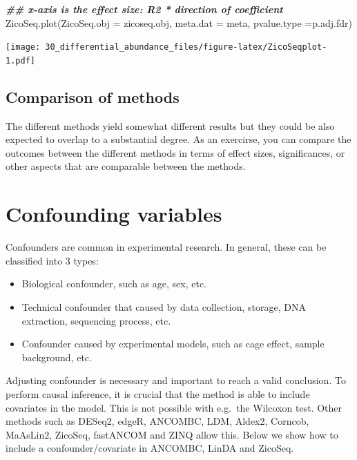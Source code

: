 \documentclass[
]{book}
\newenvironment{Shaded}{\begin{snugshade}}{\end{snugshade}}
\newcommand{\AttributeTok}[1]{\textcolor[rgb]{0.77,0.63,0.00}{#1}}
\newcommand{\DocumentationTok}[1]{\textcolor[rgb]{0.56,0.35,0.01}{\textbf{\textit{#1}}}}
\newcommand{\FunctionTok}[1]{\textcolor[rgb]{0.00,0.00,0.00}{#1}}
\newcommand{\NormalTok}[1]{#1}
\newcommand{\StringTok}[1]{\textcolor[rgb]{0.31,0.60,0.02}{#1}}
\begin{document}
\begin{Shaded}
\begin{Highlighting}[]
\DocumentationTok{\#\# x{-}axis is the effect size: R2 * direction of coefficient}
\FunctionTok{ZicoSeq.plot}\NormalTok{(}\AttributeTok{ZicoSeq.obj =}\NormalTok{ zicoseq.obj,}
             \AttributeTok{meta.dat =}\NormalTok{ meta,}
         \AttributeTok{pvalue.type =}\StringTok{\textquotesingle{}p.adj.fdr\textquotesingle{}}\NormalTok{)}
\end{Highlighting}
\end{Shaded}

\texttt{[image: 30\_differential\_abundance\_files/figure-latex/ZicoSeqplot-1.pdf]}

\hypertarget{comparison-of-methods}{%
\subsection{Comparison of methods}\label{comparison-of-methods}}

The different methods yield somewhat different results but they could
be also expected to overlap to a substantial degree. As an exercirse,
you can compare the outcomes between the different methods in terms of
effect sizes, significances, or other aspects that are comparable
between the methods.

\hypertarget{confounding-variables}{%
\section{Confounding variables}\label{confounding-variables}}

Confounders are common in experimental research. In general, these can be
classified into 3 types:

\begin{itemize}
\item
  Biological confounder, such as age, sex, etc.
\item
  Technical confounder that caused by data collection, storage, DNA
  extraction, sequencing process, etc.
\item
  Confounder caused by experimental models, such as cage effect,
  sample background, etc.
\end{itemize}

Adjusting confounder is necessary and important to reach a valid
conclusion. To perform causal inference, it is crucial that the method
is able to include covariates in the model. This is not possible with
e.g.~the Wilcoxon test. Other methods such as DESeq2, edgeR, ANCOMBC,
LDM, Aldex2, Corncob, MaAsLin2, ZicoSeq, fastANCOM and ZINQ allow
this. Below we show how to include a confounder/covariate in ANCOMBC,
LinDA and ZicoSeq.
\end{document}
